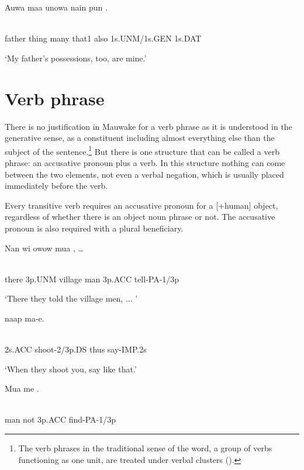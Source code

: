 \ea%
\label{ex:x847}
\gll Auwa  maa  unowa  nain  pun  . \\
      \\
\glt
\z

father  thing  many  that1  also  1s.UNM/1s.GEN  1s.DAT

`My father's possessions, too, are mine.'

\section{Verb phrase}
\hypertarget{RefHeading21801935131865}{}
There is no justification in Mauwake for a verb phrase as it is understood in the generative sense, as a constituent including almost everything else than the subject of the sentence.\footnote{The verb phrases in the traditional sense of the word, a group of verbs functioning as one unit, are treated under verbal clusters ().}  But there is one structure that can be called a verb phrase: an accusative pronoun plus a verb.  In this structure nothing can come between the two elements, not even a verbal negation, which is usually placed immediately before the verb.

Every transitive verb requires an accusative pronoun for a [+human] object, regardless of whether there is an object noun phrase or not. The accusative pronoun is also required with a plural beneficiary. 

\ea%
\label{ex:x848}
\gll Nan  wi  owow  mua  ,  {\dots} \\
      \\
\glt
\z

there  3p.UNM  village  man  3p.ACC  tell-PA-1/3p

`There they told the village men, ... '

\ea%
\label{ex:x852}
\gll {}  naap  ma-e. \\
      \\
\glt
\z

2s.ACC  shoot-2/3p.DS  thus  say-IMP.2s

`When they shoot you, say like that.'

\ea%
\label{ex:x849}
\gll Mua  me  . \\
      \\
\glt
\z

man  not  3p.ACC  find-PA-1/3p

